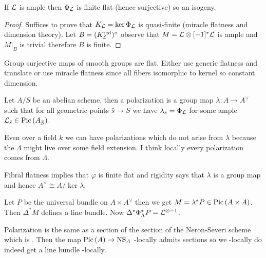 \documentclass[12pt]{article}
\begin{document}
\begin{thm}
If $\mathcal{L}$ is ample then $\Phi_{\mathcal{L}}$ is finite flat (hence surjective) so an isogeny.
\end{thm}

\begin{proof}
Suffices to prove that $K_{\mathcal{L}} = \ker{\Phi_{\mathcal{L}}}$ is quasi-finite (miracle flatness and dimension theory). Let $B = (K_{\mathcal{L}}^{\mathrm{red}})^\circ$ observe that $M = \mathcal{L} \otimes [-1]^* \mathcal{L}$ is ample and $M|_B$ is trivial therefore $B$ is finite. 
\end{proof}

\begin{rmk}
Group surjective maps of smooth groups are flat. Either use generic flatness and translate or use miracle flatness since all fibers isomorphic to kernel so constant dimension.  
\end{rmk}

\begin{defn}
Let $A / S$ be an abelian scheme, then a polarization is a group map $\lambda : A \to A^\vee$ such that for all geometric points $\bar{s} \to S$ we have $\lambda_{\bar{s}} = \Phi_{\mathcal{L}}$ for some ample $\mathcal{L}_{\bar{s}} \in \mathrm{Pic} \left( A_{\bar{S}} \right)$. 
\end{defn}

\begin{rmk}
Even over a field $k$ we can have polarizations which do not arise from $\lambda$ because the $\Lambda$ might live over some field extension. I think \etale locally every polarization comes from $\Lambda$. 
\end{rmk}

\begin{rmk}
Fibral flatness implies that $\varphi$ is finite flat and rigidity says that $\lambda$ is a group map and hence $A^\vee \cong A / \ker{\lambda}$. 
\end{rmk}

\begin{rmk}
Let $P$ be the universal bundle on $A \times A^\vee$ then we get $M = \lambda^* P \in \mathrm{Pic} \left( A \times A \right)$. Then $\Delta^* M$ defines a line bundle. Now $\Delta^* \Phi_{\Lambda}^* P = \mathcal{L}^{\otimes -1}$.  
\end{rmk}

\begin{rmk}
Polarization is the same as a section of the section of the Neron-Severi scheme which is \etale. Then the map $\mathrm{Pic} \left( A \right) \to \mathrm{NS}_A$ \etale-locally admits sections so we \etale-locally do indeed get a line bundle \etale-locally. 
\end{rmk}
\end{document}
